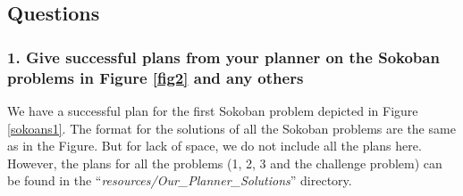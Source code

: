 \documentclass[10pt, letter]{article}
\begin{document}
\subsection{Questions}

\subsubsection*{1. Give successful plans from your planner on the Sokoban problems in Figure \ref{fig2} and any others}
We have a successful plan for the first Sokoban problem depicted in Figure \ref{sokoans1}. The format for the solutions of all the Sokoban problems are the same as in the Figure. But for lack of space, we do not include all the plans here. However, the plans for all the problems (1, 2, 3 and the challenge problem) can be found in the ``\textit{resources/Our\_Planner\_Solutions}'' directory.
\end{document}
